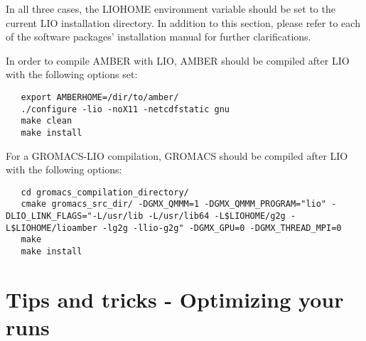 In all three cases, the LIOHOME environment variable should be
set to the current LIO installation directory. In addition
to this section, please refer to each of the software packages'
installation manual for further clarifications.

In order to compile AMBER with LIO, AMBER should be compiled
after LIO with the following options set:

\begin{lstlisting}
   export AMBERHOME=/dir/to/amber/
   ./configure -lio -noX11 -netcdfstatic gnu
   make clean
   make install
\end{lstlisting}

For a GROMACS-LIO compilation, GROMACS should be compiled 
after LIO with the following options:

\begin{lstlisting}
   cd gromacs_compilation_directory/
   cmake gromacs_src_dir/ -DGMX_QMMM=1 -DGMX_QMMM_PROGRAM="lio" -DLIO_LINK_FLAGS="-L/usr/lib -L/usr/lib64 -L$LIOHOME/g2g -L$LIOHOME/lioamber -lg2g -llio-g2g" -DGMX_GPU=0 -DGMX_THREAD_MPI=0
   make
   make install
\end{lstlisting}

\section{Tips and tricks - Optimizing your runs}


